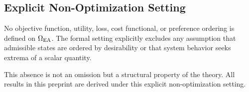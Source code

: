 \subsection{Explicit Non-Optimization Setting}

No objective function, utility, loss, cost functional, or preference
ordering is defined on $\Omega_{\mathrm{EA}}$. The formal setting explicitly excludes
any assumption that admissible states are ordered by desirability or
that system behavior seeks extrema of a scalar quantity.

This absence is not an omission but a structural property of the theory.
All results in this preprint are derived under this explicit
non-optimization setting.

